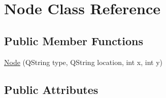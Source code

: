 \hypertarget{class_node}{\section{Node Class Reference}
\label{class_node}
}
\subsection*{Public Member Functions}
\begin{DoxyCompactItemize}
\item 
\hyperlink{class_node_a9187fcac7fd3d010e5a4e66d2ab09ca1}{Node} (Q\-String type, Q\-String location, int x, int y)
\end{DoxyCompactItemize}
\subsection*{Public Attributes}
